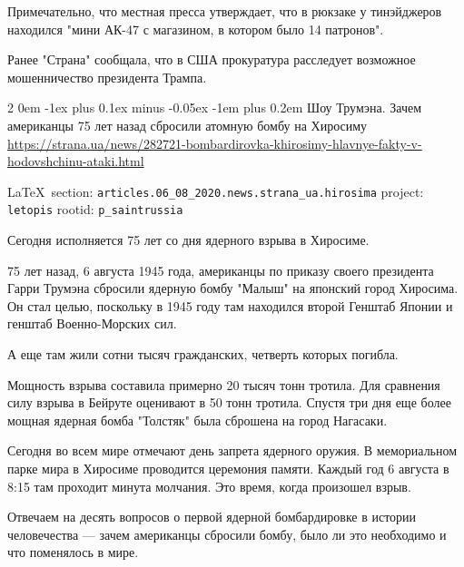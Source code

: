 \documentclass[a4paper,11pt]{extreport}
\makeatletter
\renewcommand\subsection{%
  \clearpage
    \@startsection{subsection}%
    {2}%
    {0em}%
    {-1ex plus 0.1ex minus -0.05ex}%
    {-1em plus 0.2em}%
    {\scshape\bfseries\Large}%
}
\makeatother
\begin{document}
Примечательно, что местная пресса утверждает, что в рюкзаке у тинэйджеров
находился "мини АК-47 с магазином, в котором было 14 патронов".

Ранее "Страна" сообщала, что в США прокуратура расследует возможное
мошенничество президента Трампа.
 
 
\subsection{Шоу Трумэна. Зачем американцы 75 лет назад сбросили атомную бомбу на Хиросиму}
\label{sec:articles.06_08_2020.news.strana_ua.hirosima}
\url{https://strana.ua/news/282721-bombardirovka-khirosimy-hlavnye-fakty-v-hodovshchinu-ataki.html}
  
\vspace{0.5cm}
 {\ifDEBUG\small\LaTeX~section: \verb|articles.06_08_2020.news.strana_ua.hirosima| project: \verb|letopis| rootid: \verb|p_saintrussia| \fi}
\vspace{0.5cm}

Сегодня исполняется 75 лет со дня ядерного взрыва в Хиросиме.

75 лет назад, 6 августа 1945 года, американцы по приказу своего президента
Гарри Трумэна сбросили ядерную бомбу "Малыш" на японский город Хиросима. Он
стал целью, поскольку в 1945 году там находился второй Генштаб Японии и генштаб
Военно-Морских сил. 

А еще там жили сотни тысяч гражданских, четверть которых погибла. 

Мощность взрыва составила примерно 20 тысяч тонн тротила. Для сравнения силу
взрыва в Бейруте оценивают в 50 тонн тротила. Спустя три дня еще более мощная
ядерная бомба "Толстяк" была сброшена на город Нагасаки.

Сегодня во всем мире отмечают день запрета ядерного оружия. В мемориальном
парке мира в Хиросиме проводится церемония памяти. Каждый год 6 августа в 8:15
там проходит минута молчания. Это время, когда произошел взрыв.

Отвечаем на десять вопросов о первой ядерной бомбардировке в истории
человечества --- зачем американцы сбросили бомбу, было ли это необходимо и что
поменялось в мире.
\end{document}
